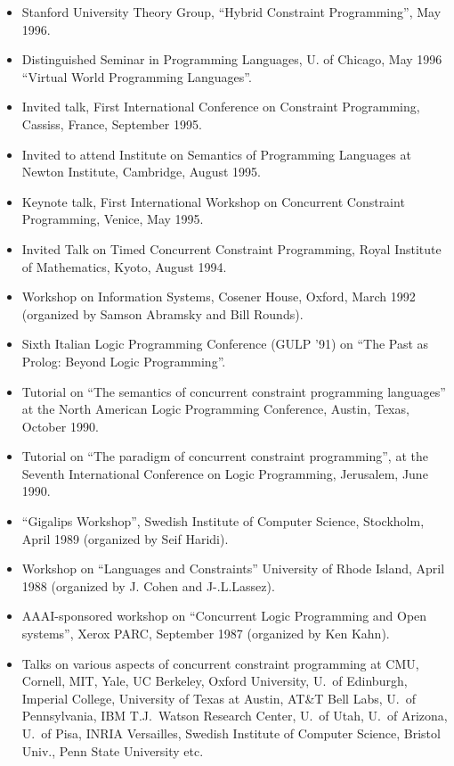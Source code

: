 \documentclass{article}
\begin{document}
\begin{itemize}
 \item Stanford University Theory Group, ``Hybrid Constraint
    Programming'', May 1996. 

 \item Distinguished Seminar in Programming Languages, U. of
    Chicago,  May 1996 ``Virtual World Programming Languages''. 

 \item Invited talk, First International Conference
    on Constraint Programming, Cassiss, France, September 1995. 

 \item Invited to attend Institute on Semantics of Programming
    Languages at Newton Institute, Cambridge, August 1995.  

 \item Keynote talk, First International Workshop on
    Concurrent Constraint Programming, Venice, May 1995. 

 \item Invited Talk on Timed Concurrent Constraint
    Programming, Royal Institute of Mathematics, Kyoto, August
    1994. 

 \item Workshop on Information Systems, Cosener House, Oxford,
    March 1992 (organized by Samson Abramsky and Bill Rounds).

 \item Sixth Italian Logic Programming Conference (GULP '91)
    on ``The Past as Prolog: Beyond Logic Programming''.

 \item Tutorial on ``The semantics of concurrent constraint
    programming languages'' at the North American Logic Programming
    Conference, Austin, Texas, October 1990.

 \item Tutorial on ``The paradigm of concurrent constraint
    programming'', at the Seventh  International Conference on Logic
    Programming, Jerusalem, June 1990. 

 \item ``Gigalips Workshop'', Swedish Institute of Computer
    Science, Stockholm, April 1989 (organized by Seif Haridi).

 \item Workshop on ``Languages and Constraints''  University of
    Rhode Island, April 1988 (organized by J. Cohen and J-.L.Lassez).

 \item AAAI-sponsored workshop on ``Concurrent Logic Programming
    and Open systems'', Xerox PARC, September 1987 (organized by Ken
    Kahn).

 \item Talks on various aspects of concurrent constraint programming
    at CMU, Cornell, MIT, Yale, UC Berkeley, Oxford University, U.~of
    Edinburgh, Imperial College, University of Texas at Austin, AT\&T
    Bell Labs, U.~of Pennsylvania, IBM T.J.~Watson Research Center,
    U.~of Utah, U.~of Arizona, U.~of Pisa, INRIA Versailles, Swedish
    Institute of Computer Science, Bristol Univ., Penn State
    University etc.
\end{itemize}
\end{document}
